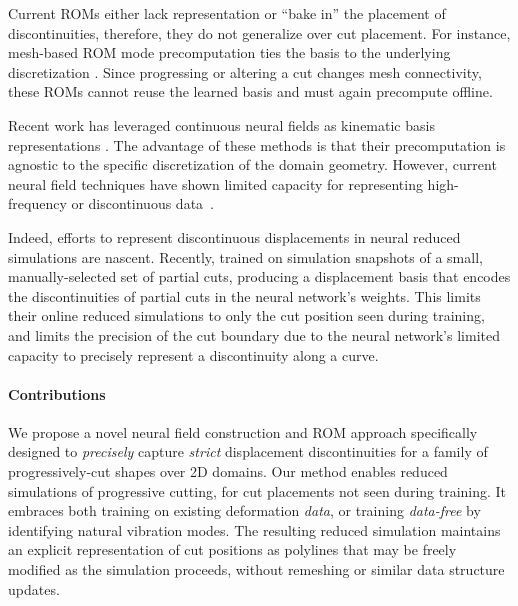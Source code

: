 Current ROMs either lack representation or ``bake in'' the placement of discontinuities, therefore, they do not generalize over cut placement. For instance,  mesh-based ROM mode precomputation ties the basis to the underlying discretization  \cite{sifakis2012fem,Fulton:LSD:2018,shen2021high}. Since progressing or altering a cut changes mesh connectivity, these ROMs cannot reuse the learned basis and must again precompute offline.


Recent work has leveraged continuous neural fields as kinematic basis representations \cite{pan2022neural,chen2023crom,puri2024snf,tao2024neural}. The advantage of these methods is that their precomputation is agnostic to the specific discretization of the domain geometry. However, current neural field techniques have shown limited capacity for representing high-frequency or discontinuous data~\cite{Belhe:2023:DiscontinuityAwareNeuralFields}.

Indeed, efforts to represent discontinuous displacements in neural reduced simulations are nascent. Recently, \citet{chang:2023:licrom} trained on simulation snapshots of a small, manually-selected set of partial cuts, producing a displacement basis that encodes the discontinuities of partial cuts in the neural network's weights. This limits their online reduced simulations to only the cut position seen during training, and limits the precision of the cut boundary due to the neural network's limited capacity to precisely represent a discontinuity along a curve.


\paragraph{Contributions}
We propose a novel neural field construction and ROM approach specifically designed to \emph{precisely} capture \emph{strict} displacement discontinuities for a family of progressively-cut shapes over 2D domains. Our method enables reduced simulations of progressive cutting, for cut placements not seen during training. It embraces both training on existing deformation \emph{data}, or training \emph{data-free} by identifying natural vibration modes. The resulting reduced simulation maintains an explicit representation of cut positions as polylines that may be freely modified as the simulation proceeds, without remeshing or similar data structure updates.

